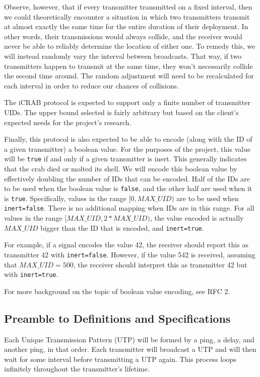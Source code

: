 \documentclass[12pt]{article}
\begin{document}
Observe, however, that if every transmitter transmitted on a fixed interval,
then we could theoretically encounter a situation in which two transmitters
transmit at almost exactly the same time for the entire duration of their
deployment.
In other words, their transmissions would always collide, and the receiver
would never be able to reliably determine the location of either one.
To remedy this, we will instead randomly vary the interval between broadcasts.
That way, if two transmitters happen to transmit at the same time,
they won't necessarily collide the second time around.
The random adjustment will need to be recalculated for each interval in order
to reduce our chances of collisions.

The iCRAB protocol is expected to support only a finite number of transmitter
UIDs.
The upper bound selected is fairly arbitrary but based on the client's expected
needs for the project's research.

Finally, this protocol is also expected to be able to encode (along with the
ID of a given transmitter) a boolean value.
For the purposes of the project, this value will be \texttt{true}
if and only if a given  transmitter is inert.
This generally indicates that the crab died or molted its shell.
We will encode this boolean value by effectively doubling the number of IDs
that can be encoded.
Half of the IDs are to be used when the boolean value is \texttt{false},
and the other half are used when it is \texttt{true}.
Specifically, values in the range $[0, MAX\_UID)$ are to be used when
\texttt{inert=false}.
There is no additional mapping when IDs are in this range.
For all values in the range $[MAX\_UID, 2*MAX\_UID)$, the value encoded is
actually $MAX\_UID$ bigger than the ID that is encoded, and
\texttt{inert=true}.

For example, if a signal encodes the value 42, the receiver should report
this as transmitter 42 with \texttt{inert=false}.
However, if the value 542 is received, assuming that $MAX\_UID=500$,
the receiver should interpret this as transmitter 42 but with
\texttt{inert=true}.

For more background on the topic of boolean value encoding, see RFC 2.

\subsection{Preamble to Definitions and Specifications} \label{preamble}

Each Unique Transmission Pattern (UTP) will be formed by a ping, a delay,
and another ping, in that order.
Each transmitter will broadcast a UTP and will then wait for some interval
before transmitting a UTP again.
This process loops infinitely throughout the transmitter's lifetime.
\end{document}
